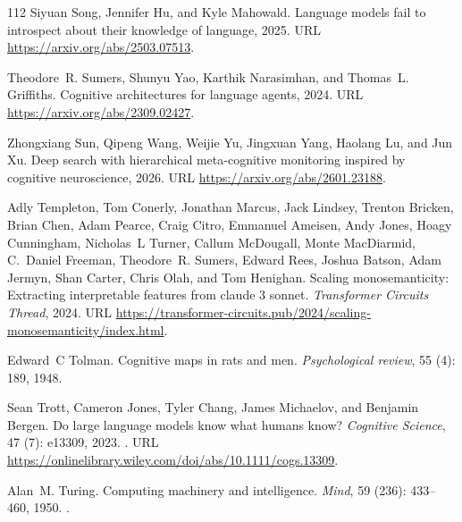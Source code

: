 \begin{thebibliography}{112}
Siyuan Song, Jennifer Hu, and Kyle Mahowald.
\newblock Language models fail to introspect about their knowledge of language, 2025.
\newblock URL \url{https://arxiv.org/abs/2503.07513}.

Theodore~R. Sumers, Shunyu Yao, Karthik Narasimhan, and Thomas~L. Griffiths.
\newblock Cognitive architectures for language agents, 2024.
\newblock URL \url{https://arxiv.org/abs/2309.02427}.

Zhongxiang Sun, Qipeng Wang, Weijie Yu, Jingxuan Yang, Haolang Lu, and Jun Xu.
\newblock Deep search with hierarchical meta-cognitive monitoring inspired by cognitive neuroscience, 2026.
\newblock URL \url{https://arxiv.org/abs/2601.23188}.

Adly Templeton, Tom Conerly, Jonathan Marcus, Jack Lindsey, Trenton Bricken, Brian Chen, Adam Pearce, Craig Citro, Emmanuel Ameisen, Andy Jones, Hoagy Cunningham, Nicholas~L Turner, Callum McDougall, Monte MacDiarmid, C.~Daniel Freeman, Theodore~R. Sumers, Edward Rees, Joshua Batson, Adam Jermyn, Shan Carter, Chris Olah, and Tom Henighan.
\newblock Scaling monosemanticity: Extracting interpretable features from claude 3 sonnet.
\newblock \emph{Transformer Circuits Thread}, 2024.
\newblock URL \url{https://transformer-circuits.pub/2024/scaling-monosemanticity/index.html}.

Edward~C Tolman.
\newblock Cognitive maps in rats and men.
\newblock \emph{Psychological review}, 55 (4): 189, 1948.

Sean Trott, Cameron Jones, Tyler Chang, James Michaelov, and Benjamin Bergen.
\newblock Do large language models know what humans know?
\newblock \emph{Cognitive Science}, 47 (7): e13309, 2023.
\newblock {}.
\newblock URL \url{https://onlinelibrary.wiley.com/doi/abs/10.1111/cogs.13309}.

Alan~M. Turing.
\newblock Computing machinery and intelligence.
\newblock \emph{Mind}, 59 (236): 433--460, 1950.
\newblock {}.


\end{thebibliography}

